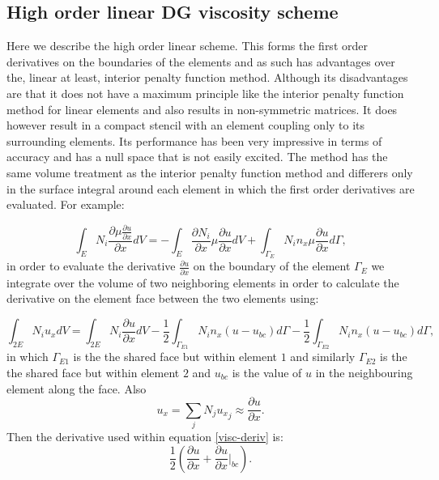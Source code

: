 \subsection{High order linear DG viscosity scheme} 
Here we describe the high order linear scheme. This forms the first order derivatives 
on the boundaries of the elements and as such has advantages over the, linear at least, 
interior penalty function method. Although its disadvantages are that it does not have 
a maximum principle like the interior penalty function method for linear elements and also 
results in non-symmetric matrices. It does however result in a compact stencil with 
an element coupling only to its surrounding elements. Its performance has been very impressive 
in terms of accuracy and has a null space that is not easily excited. 
The method has the same volume treatment as the interior penalty function method 
and differers only in the surface integral around each element in which the first order derivatives 
are evaluated. 
For example:

\begin{equation}
\int_E N_i \frac{\partial \mu    \frac{\partial u}{\partial x}
}{\partial x} dV 
=
- \int_E \frac{\partial N_i}{\partial x} \mu \frac{\partial u}{\partial x} dV
+ \int_{\Gamma_E} N_i n_x \mu \frac{\partial u}{\partial x} d\Gamma, 
\label{visc-deriv} 
\end{equation} 
in order to evaluate the derivative $\frac{\partial u}{\partial x}$ 
on the boundary of the element ${\Gamma_E}$ we integrate over the volume 
of two neighboring elements in order to calculate the derivative on the element 
face between the two elements using: 


\begin{equation}
\int_{2E} N_i  u_x  dV 
=
\int_{2E} N_i  \frac{\partial u}{\partial x} dV 
- \frac{1}{2} \int_{\Gamma_{E1}} N_i n_x (u-u_{bc}) d\Gamma
- \frac{1}{2} \int_{\Gamma_{E2}} N_i n_x (u-u_{bc}) d\Gamma, 
\end{equation} 
in which ${\Gamma_{E1}}$ is the the shared face but within element $1$ and 
similarly ${\Gamma_{E2}}$ is the the shared face but within element $2$ 
and $u_{bc}$ is the value of $u$ in the neighbouring element along the face. 
Also
\begin{equation}
u_x =\sum_j N_j {u_x}_j  \approx 
 \frac{\partial u}{\partial x} . 
\end{equation} 
Then the derivative used within equation \ref{visc-deriv} is:
\begin{equation}
\frac{1}{2} (\frac{\partial u}{\partial x}+\frac{\partial u}{\partial x}\vert_{bc} ).
\end{equation} 




